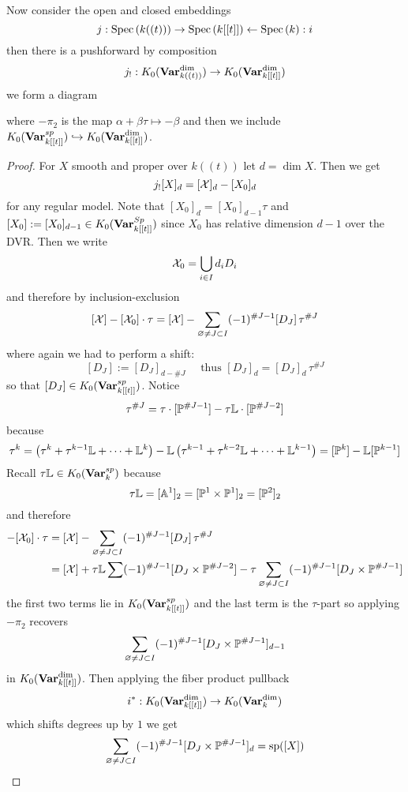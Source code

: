 \documentclass[12pt]{article}
\newcommand{\LL}{\mathbb{L}}
\begin{document}
\begin{prop}
Now consider the open and closed embeddings
\[ j : \Spec{k((t))} \to \Spec{k[[t]]} \leftarrow \Spec{k} : i \]
then there is a pushforward by composition
\[ j_! : K_0(\Var_{k((t))}^{\dim}) \to K_0(\Var^{\dim}_{k[[t]]}) \]
we form a diagram
\begin{center}
\end{center}
where $-\pi_2$ is the map $\alpha + \beta \tau \mapsto - \beta$ and then we include $K_0(\Var_{k[[t]]}^{sp}) \embed K_0(\Var_{k[[t]]}^{\dim})$. 
\end{prop}

\begin{proof}
For $X$ smooth and proper over $k((t))$ let $d = \dim{X}$. Then we get 
\[ j_! [X]_{d} = [\X]_{d} - [X_0]_d \]
for any regular model. Note that $[X_0]_d = [X_0]_{d-1} \tau$ and $[X_0] := [X_0]_{d-1} \in K_0(\Var^{Sp}_{k[[t]]})$ since $X_0$ has relative dimension $d-1$ over the DVR. Then we write
\[ \X_0 = \bigcup_{i \in I} d_i D_i \]
and therefore by inclusion-exclusion
\[ [\X] - [\X_0] \cdot \tau = [\X] - \sum_{\varnothing \neq J \subset I} (-1)^{\# J - 1} [D_J] \, \tau^{\# J} \]
where again we had to perform a shift: 
\[ [D_J] := [D_J]_{d - \# J} \quad \text{ thus } [D_J]_{d} = [D_J]_{d} \, \tau^{\# J} \]
so that $[D_J] \in K_0(\Var^{sp}_{k[[t]]})$. 
Notice
\[ \tau^{\# J} = \tau \cdot [\P^{\# J - 1}] - \tau \LL \cdot [\P^{\# J - 2}] \]
because 
\[ \tau^{k} = \left( \tau^{k} + \tau^{k-1} \LL + \cdots + \LL^{k} \right) - \LL \left(\tau^{k-1} + \tau^{k-2} \LL + \cdots + \LL^{k-1} \right) = [\PP^k] - \LL [\PP^{k-1}] \]
Recall $\tau \LL \in K_0(\Var_k^{sp})$ because
\[ \tau \LL = [\A^1]_2 = [\P^1 \times \P^1]_2 = [\P^2]_2 \]
and therefore 
\begin{align*}
[\X] - [\X_0] \cdot \tau & = [\X] - \sum_{\varnothing \neq J \subset I} (-1)^{\# J - 1} [D_J] \, \tau^{\# J} 
\\
& = [\X] + \tau \LL \sum(-1)^{\# J - 1} [D_J \times \P^{\# J - 2}] - \tau \sum_{\varnothing \neq J \subset I} (-1)^{\# J - 1} [D_J \times \P^{\# J - 1}]
\end{align*}
the first two terms lie in $K_0(\Var^{sp}_{k[[t]]})$ and the last term is the $\tau$-part so applying $-\pi_2$ recovers
\[ \sum_{\varnothing \neq J \subset I} (-1)^{\# J - 1} [D_J \times \P^{\# J - 1}]_{d-1} \]
in $K_0(\Var_{k[[t]]}^{\dim})$. Then applying the fiber product pullback
\[ i^* : K_0(\Var_{k[[t]]}^{\dim}) \to K_0(\Var_k^{\dim}) \]
which shifts degrees up by $1$ we get 
\[ \sum_{\varnothing \neq J \subset I} (-1)^{\# J - 1} [D_J \times \P^{\# J - 1}]_{d} = \sp([X]) \]
\end{proof}
\end{document}
